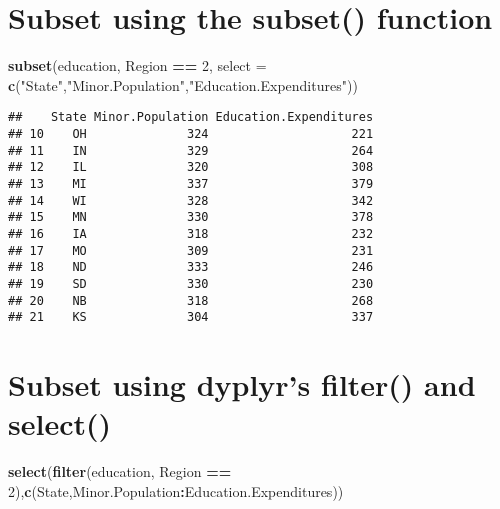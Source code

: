 \documentclass[]{book}
\newenvironment{Shaded}{\begin{snugshade}}{\end{snugshade}}
\newcommand{\DataTypeTok}[1]{\textcolor[rgb]{0.13,0.29,0.53}{#1}}
\newcommand{\DecValTok}[1]{\textcolor[rgb]{0.00,0.00,0.81}{#1}}
\newcommand{\KeywordTok}[1]{\textcolor[rgb]{0.13,0.29,0.53}{\textbf{#1}}}
\newcommand{\NormalTok}[1]{#1}
\newcommand{\OperatorTok}[1]{\textcolor[rgb]{0.81,0.36,0.00}{\textbf{#1}}}
\newcommand{\StringTok}[1]{\textcolor[rgb]{0.31,0.60,0.02}{#1}}
\begin{document}
\hypertarget{subset-using-the-subset-function}{%
\section{Subset using the subset() function}\label{subset-using-the-subset-function}}

\begin{Shaded}
\begin{Highlighting}[]
\KeywordTok{subset}\NormalTok{(education, Region }\OperatorTok{==}\StringTok{ }\DecValTok{2}\NormalTok{, }\DataTypeTok{select =} \KeywordTok{c}\NormalTok{(}\StringTok{"State"}\NormalTok{,}\StringTok{"Minor.Population"}\NormalTok{,}\StringTok{"Education.Expenditures"}\NormalTok{))}
\end{Highlighting}
\end{Shaded}

\begin{verbatim}
##    State Minor.Population Education.Expenditures
## 10    OH              324                    221
## 11    IN              329                    264
## 12    IL              320                    308
## 13    MI              337                    379
## 14    WI              328                    342
## 15    MN              330                    378
## 16    IA              318                    232
## 17    MO              309                    231
## 18    ND              333                    246
## 19    SD              330                    230
## 20    NB              318                    268
## 21    KS              304                    337
\end{verbatim}

\hypertarget{subset-using-dyplyrs-filter-and-select}{%
\section{Subset using dyplyr's filter() and select()}\label{subset-using-dyplyrs-filter-and-select}}

\begin{Shaded}
\begin{Highlighting}[]
\KeywordTok{select}\NormalTok{(}\KeywordTok{filter}\NormalTok{(education, Region }\OperatorTok{==}\StringTok{ }\DecValTok{2}\NormalTok{),}\KeywordTok{c}\NormalTok{(State,Minor.Population}\OperatorTok{:}\NormalTok{Education.Expenditures))}
\end{Highlighting}
\end{Shaded}
\end{document}
